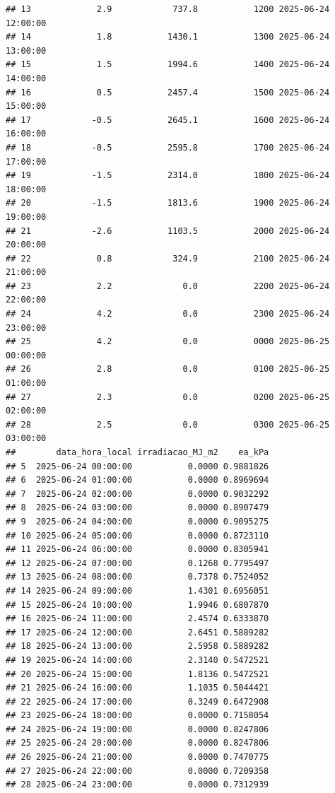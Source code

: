 \documentclass[
]{article}
\begin{document}
\begin{verbatim}
## 13             2.9            737.8           1200 2025-06-24 12:00:00
## 14             1.8           1430.1           1300 2025-06-24 13:00:00
## 15             1.5           1994.6           1400 2025-06-24 14:00:00
## 16             0.5           2457.4           1500 2025-06-24 15:00:00
## 17            -0.5           2645.1           1600 2025-06-24 16:00:00
## 18            -0.5           2595.8           1700 2025-06-24 17:00:00
## 19            -1.5           2314.0           1800 2025-06-24 18:00:00
## 20            -1.5           1813.6           1900 2025-06-24 19:00:00
## 21            -2.6           1103.5           2000 2025-06-24 20:00:00
## 22             0.8            324.9           2100 2025-06-24 21:00:00
## 23             2.2              0.0           2200 2025-06-24 22:00:00
## 24             4.2              0.0           2300 2025-06-24 23:00:00
## 25             4.2              0.0           0000 2025-06-25 00:00:00
## 26             2.8              0.0           0100 2025-06-25 01:00:00
## 27             2.3              0.0           0200 2025-06-25 02:00:00
## 28             2.5              0.0           0300 2025-06-25 03:00:00
##        data_hora_local irradiacao_MJ_m2    ea_kPa
## 5  2025-06-24 00:00:00           0.0000 0.9881826
## 6  2025-06-24 01:00:00           0.0000 0.8969694
## 7  2025-06-24 02:00:00           0.0000 0.9032292
## 8  2025-06-24 03:00:00           0.0000 0.8907479
## 9  2025-06-24 04:00:00           0.0000 0.9095275
## 10 2025-06-24 05:00:00           0.0000 0.8723110
## 11 2025-06-24 06:00:00           0.0000 0.8305941
## 12 2025-06-24 07:00:00           0.1268 0.7795497
## 13 2025-06-24 08:00:00           0.7378 0.7524052
## 14 2025-06-24 09:00:00           1.4301 0.6956051
## 15 2025-06-24 10:00:00           1.9946 0.6807870
## 16 2025-06-24 11:00:00           2.4574 0.6333870
## 17 2025-06-24 12:00:00           2.6451 0.5889282
## 18 2025-06-24 13:00:00           2.5958 0.5889282
## 19 2025-06-24 14:00:00           2.3140 0.5472521
## 20 2025-06-24 15:00:00           1.8136 0.5472521
## 21 2025-06-24 16:00:00           1.1035 0.5044421
## 22 2025-06-24 17:00:00           0.3249 0.6472908
## 23 2025-06-24 18:00:00           0.0000 0.7158054
## 24 2025-06-24 19:00:00           0.0000 0.8247806
## 25 2025-06-24 20:00:00           0.0000 0.8247806
## 26 2025-06-24 21:00:00           0.0000 0.7470775
## 27 2025-06-24 22:00:00           0.0000 0.7209358
## 28 2025-06-24 23:00:00           0.0000 0.7312939
\end{verbatim}
\end{document}
